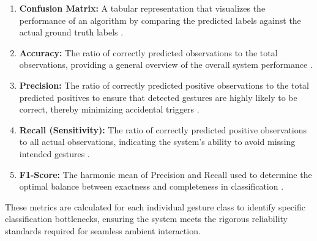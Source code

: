 \begin{enumerate}
    \item \textbf{Confusion Matrix:} A tabular representation that visualizes the performance of an algorithm by comparing the predicted labels against the actual ground truth labels \cite{Hossin2023}.

    \item \textbf{Accuracy:} The ratio of correctly predicted observations to the total observations, providing a general overview of the overall system performance \cite{grandini2020metrics}.

    \item \textbf{Precision:} The ratio of correctly predicted positive observations to the total predicted positives to ensure that detected gestures are highly likely to be correct, thereby minimizing accidental triggers \cite{grandini2020metrics}.

    \item \textbf{Recall (Sensitivity):} The ratio of correctly predicted positive observations to all actual observations, indicating the system's ability to avoid missing intended gestures \cite{grandini2020metrics}.
    
    \item \textbf{F1-Score:} The harmonic mean of Precision and Recall used to determine the optimal balance between exactness and completeness in classification \cite{grandini2020metrics}.
\end{enumerate}

These metrics are calculated for each individual gesture class to identify specific classification bottlenecks, ensuring the system meets the rigorous reliability standards required for seamless ambient interaction.
